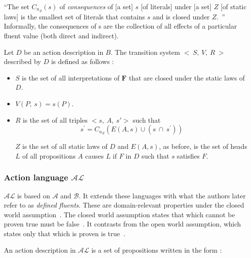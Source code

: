 \begin{definition}
    ``The set $C_{n_Z}\left(s\right)$ of \textit{consequences} of [a set] $s$ [of literals] under [a set] $Z$ [of static laws] is the smallest set of literals that contains $s$ and is closed under $Z$.~\cite{gelfond_action_1998}''
    Informally, the consequences of s are the collection of all effects of a particular fluent value (both direct and indirect).
\end{definition}

\begin{definition}

    Let $D$ be an action description in $B$.
    The transition system $<\ S,\ V,\ R\ >$ described by $D$ is defined as follows \cite{gelfond_action_1998}:

    \begin{itemize}
        \item $S$ is the set of all interpretations of $\boldsymbol{F}$ that are closed under the static laws of $D$.
        \item $V(P,\ s)=s(P)$.
        \item $R$ is the set of all triples $<s,\ A,\ s\prime>$ such that
            $$
            s^\prime=C_{n_Z}\left(E\left(A,s\right)\cup\left(s\ \cap\ s^\prime\right)\right)
            $$

            $ Z $ is the set of all static laws of $D$ and $E(A, s)$, as before, is the set of heads $L$ of all propositions $A$ causes $L$ if $F$ in $D$ such that $s$ satisfies $F$.
    \end{itemize}
\end{definition}

\subsubsection{Action language $ \mathcal{AL} $}
\label{subsubsec:action_language_al}

$ \mathcal{AL} $ is based on $ \mathcal{A} $ and $ \mathcal{B} $.
It extends these languages with what the authors later refer to as \textit{defined fluents}.
These are domain-relevant properties under the closed world assumption~\cite{blount_architecture_2013}.
The closed world assumption states that which cannot be proven true must be false~\cite{reiter_closed_1981}.
It contrasts from the open world assumption, which states only that which is proven is true~\cite{reiter_closed_1981}.

An action description in $ \mathcal{AL} $ is a set of propositions written in the form \cite{baral_reasoning_2000, blount_architecture_2013}:

